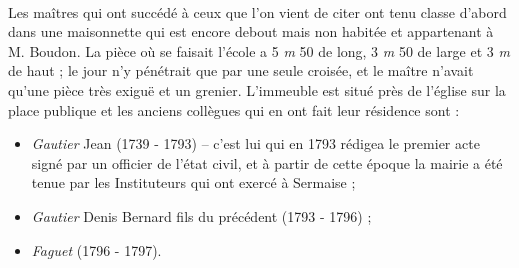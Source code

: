 \documentclass[../eBook.tex]{subfiles}
\begin{document}
      \paragraph{}Les maîtres qui ont succédé à ceux que l'on vient de citer ont tenu classe d'abord dans une maisonnette qui est encore debout mais non habitée et appartenant à M. Boudon. La pièce où se faisait l'école a 5 \textit{m} 50 de long, 3 \textit{m} 50 de large et 3 \textit{m} de haut ; le jour n'y pénétrait que par une seule croisée, et le maître n'avait qu'une pièce très exiguë et un grenier. L'immeuble est situé près de l'église sur la place publique et les anciens collègues qui en ont fait leur résidence sont :
      \begin{itemize}[noitemsep]
        \setlength{\baselineskip}{16pt}
        \item[] \textit{Gautier} Jean (1739 - 1793) -- c'est lui qui en 1793 rédigea le premier acte signé par un officier de l'état civil, et à partir de cette époque la mairie a été tenue par les Instituteurs qui ont exercé à Sermaise ;
        \item[] \textit{Gautier} Denis Bernard fils du précédent (1793 - 1796) ;
        \item[] \textit{Faguet} (1796 - 1797).
      \end{itemize}

\end{document}

